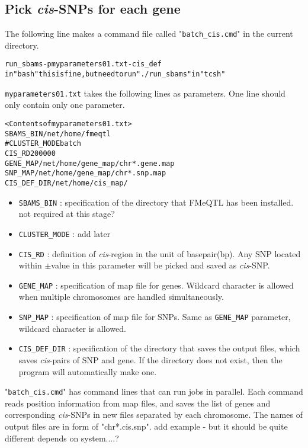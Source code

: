 \documentclass[11pt,fleqn]{article}
\begin{document}
\subsection{Pick {\textit{\textbf{cis}}}-SNPs for each gene}
 The following line makes a command file called "{\tt batch\_cis.cmd}" in the current directory. 
 \begin{alltt}
 run_sbams -p myparameters01.txt -cis_def
 {\color{red} in "bash" this is fine, but need to run "./run_sbams" in "tcsh"} 
 \end{alltt}
 {\tt myparameters01.txt} takes the following lines as parameters. One line should only contain only one parameter.
 \begin{alltt}
 <Contents of myparameters01.txt>
 SBAMS_BIN /net/home/fmeqtl
 #CLUSTER_MODE batch
 CIS_RD 200000
 GENE_MAP /net/home/gene_map/chr*.gene.map
 SNP_MAP /net/home/gene_map/chr*.snp.map
 CIS_DEF_DIR /net/home/cis_map/
 \end{alltt}
 \begin{itemize}
 	\item {\tt SBAMS\_BIN} : specification of the directory that FMeQTL has been installed. {\color{red} not required at this stage?}
 	\item {\tt CLUSTER\_MODE} : {\color{red} add later}
 	\item {\tt CIS\_RD} : definition of \textit{cis}-region in the unit of basepair(bp). Any SNP located within $\pm$value in this parameter will be picked and saved as \textit{cis}-SNP.
 	\item {\tt GENE\_MAP} : specification of map file for genes. Wildcard character is allowed when multiple chromosomes are handled simultaneously.
 	\item {\tt SNP\_MAP} : specification of map file for SNPs. Same as {\tt GENE\_MAP} parameter, wildcard character is allowed.
 	\item {\tt CIS\_DEF\_DIR} : specification of the directory that saves the output files, which saves \textit{cis}-pairs of SNP and gene. If the directory does not exist, then the program will automatically make one. 	
 \end{itemize}
 "{\tt batch\_cis.cmd}" has command lines that can run jobs in parallel. Each command reads position information from map files, and saves the list of genes and corresponding \textit{cis}-SNPs in new files separated by each chromosome. The names of output files are in form of "chr*.cis.snp".
 {\color{red} add example - but it should be quite different depends on system....?}
\end{document}
